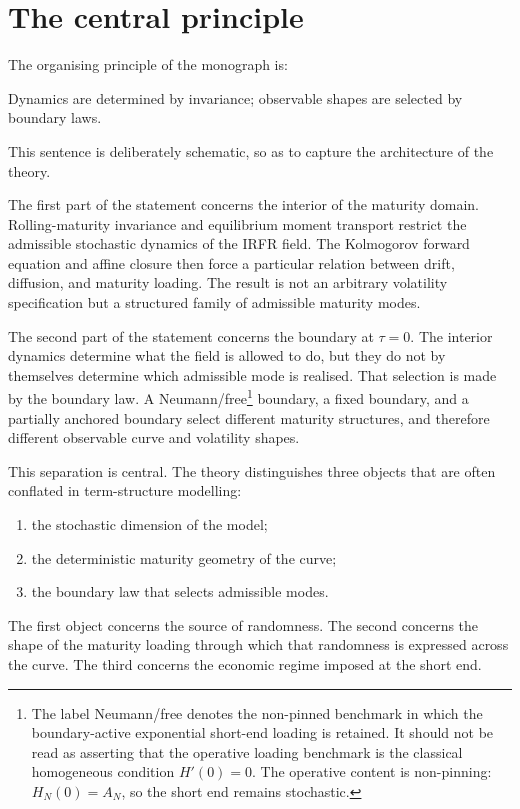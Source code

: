 \documentclass[11pt,oneside]{book}
\begin{document}
\section{The central principle}\label{the-central-principle}

The organising principle of the monograph is:

Dynamics are determined by invariance; observable shapes are selected by
boundary laws.

This sentence is deliberately schematic, so as to capture the
architecture of the theory.

The first part of the statement concerns the interior of the maturity
domain. Rolling-maturity invariance and equilibrium moment transport
restrict the admissible stochastic dynamics of the IRFR field. The
Kolmogorov forward equation and affine closure then force a particular
relation between drift, diffusion, and maturity loading. The result is
not an arbitrary volatility specification but a structured family of
admissible maturity modes.

The second part of the statement concerns the boundary at $\tau=0$. The
interior dynamics determine what the field is allowed to do, but they do
not by themselves determine which admissible mode is realised. That
selection is made by the boundary law. A Neumann/free\footnote{The label Neumann/free denotes the non-pinned benchmark in which the boundary-active exponential short-end loading is retained. It should not be read as asserting that the operative loading benchmark is the classical homogeneous condition $H'(0)=0$. The operative content is non-pinning: $H_N(0)=A_N$, so the short end remains stochastic.} boundary, a fixed
boundary, and a partially anchored boundary select different maturity
structures, and therefore different observable curve and volatility
shapes.

This separation is central. The theory distinguishes three objects that
are often conflated in term-structure modelling:

\begin{enumerate}
\def\labelenumi{\arabic{enumi}.}
\item
  the stochastic dimension of the model;
\item
  the deterministic maturity geometry of the curve;
\item
  the boundary law that selects admissible modes.
\end{enumerate}

The first object concerns the source of randomness. The second concerns
the shape of the maturity loading through which that randomness is
expressed across the curve. The third concerns the economic regime
imposed at the short end.
\end{document}
